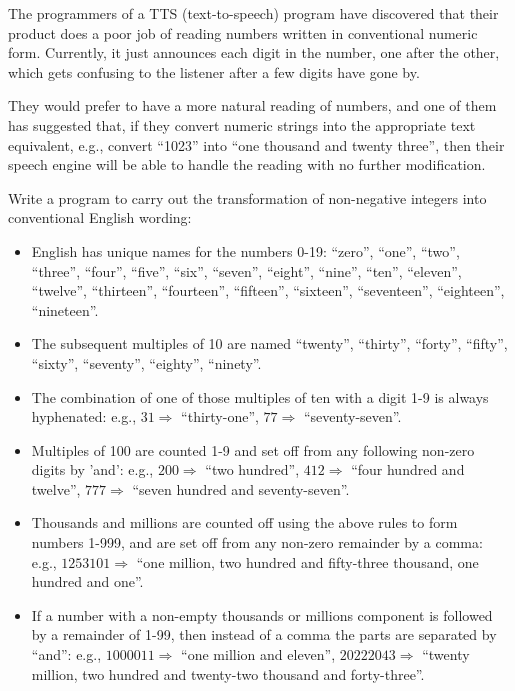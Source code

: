 

The programmers of a TTS (text-to-speech) program have discovered that
their product does a poor job of reading numbers written in
conventional numeric form. Currently, it just announces each digit in
the number, one after the other, which gets confusing to the listener
after a few digits have gone by.

They would prefer to have a more natural reading of numbers, and one
of them has suggested that, if they convert numeric strings into the
appropriate text equivalent, e.g., convert ``1023'' into ``one
thousand and twenty three'', then their speech engine will be able to
handle the reading with no further modification.

Write a program to carry out the transformation of non-negative
integers into conventional English wording:

\begin{itemize}

\item English has unique names for the numbers 0-19: ``zero'',
  ``one'', ``two'', ``three'', ``four'', ``five'', ``six'', ``seven'',
  ``eight'', ``nine'', ``ten'', ``eleven'', ``twelve'', ``thirteen'',
  ``fourteen'', ``fifteen'', ``sixteen'', ``seventeen'', ``eighteen'',
  ``nineteen''.

\item The subsequent multiples of 10 are named ``twenty'', ``thirty'',
  ``forty'', ``fifty'', ``sixty'', ``seventy'', ``eighty'', ``ninety''.

\item The combination of one of those multiples of ten with a digit
  1-9 is always hyphenated: e.g., $31 \Rightarrow$ ``thirty-one'', $77
  \Rightarrow$ ``seventy-seven''.

\item Multiples of 100 are counted 1-9 and set off from any following
  non-zero digits by 'and': e.g., $200 \Rightarrow$ ``two hundred'',
  $412 \Rightarrow$ ``four hundred and twelve'', $777 \Rightarrow$
  ``seven hundred and seventy-seven''.

\item Thousands and millions are counted off using the above rules to
  form numbers 1-999, and are set off from any non-zero remainder 
  by a comma: e.g., $\num{1253101} \Rightarrow$ ``one million, two hundred
  and fifty-three thousand, one hundred and one''.

\item If a number with a non-empty thousands or millions component is
  followed by a remainder of 1-99, then instead of a comma the parts
  are separated by ``and'': e.g., $\num{1000011} \Rightarrow$ ``one
  million and eleven'', $\num{20222043} \Rightarrow$ ``twenty million, two
  hundred and twenty-two thousand and forty-three''.
\end{itemize}

